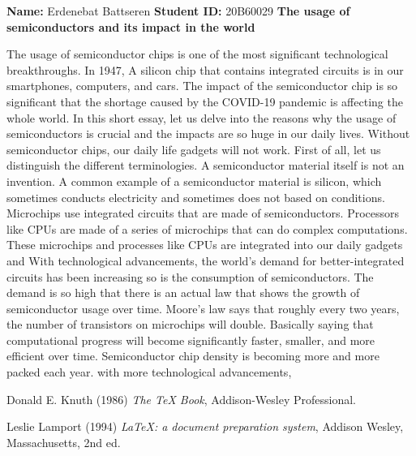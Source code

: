 \documentclass{article} %
\begin{document}

\begin{large}
\noindent
\textbf{Name:} Erdenebat Battseren \: \textbf{Student ID:} 20B60029
\newline
\textbf{The usage of semiconductors and its impact in the world}
\end{large}  
\vspace{0.2 cm}
\noindent
\newline
The usage of semiconductor chips is one of the most significant technological breakthroughs. In 1947, A silicon chip that contains integrated circuits is in our smartphones, computers, and cars. The impact of the semiconductor chip is so significant that the shortage caused by the COVID-19 pandemic is affecting the whole world. In this short essay, let us delve into the reasons why the usage of semiconductors is crucial and the impacts are so huge in our daily lives. 
\vspace{0.2 cm}
\newline
Without semiconductor chips, our daily life gadgets will not work. First of all, let us distinguish the different terminologies. A semiconductor material itself is not an invention. A common example of a semiconductor material is silicon, which sometimes conducts electricity and sometimes does not based on conditions. Microchips use integrated circuits that are made of semiconductors. Processors like CPUs are made of a series of microchips that can do complex computations. These microchips and processes like CPUs are integrated into our daily gadgets and
\vspace{0.2 cm}
\newline
With technological advancements, the world's demand for better-integrated circuits has been increasing so is the consumption of semiconductors. The demand is so high that there is an actual law that shows the growth of semiconductor usage over time. Moore's law says that roughly every two years, the number of transistors on microchips will double. Basically saying that computational progress will become significantly faster, smaller, and more efficient over time.
\vspace{0.2 cm}
\newline
Semiconductor chip density is becoming more and more packed each year. with more technological advancements, 
 
\begin{thebibliography}{9}
    Donald E. Knuth (1986) \emph{The \TeX{} Book}, Addison-Wesley Professional.
    
    Leslie Lamport (1994) \emph{\LaTeX: a document preparation system}, Addison
    Wesley, Massachusetts, 2nd ed.
    \end{thebibliography}
\end{document}
